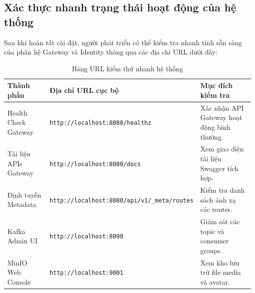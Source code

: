 \documentclass[14pt,a4paper,oneside]{extreport}
\begin{document}
\subsection{Xác thực nhanh trạng thái hoạt động của hệ thống}
Sau khi hoàn tất cài đặt, người phát triển có thể kiểm tra nhanh tính sẵn sàng của phân hệ Gateway và Identity thông qua các địa chỉ URL dưới đây:

\begin{table}[H]
\centering
\caption{Bảng URL kiểm thử nhanh hệ thống}
\label{tab:url-check}
\renewcommand{\arraystretch}{1.3}
\small
\begin{tabularx}{\textwidth}{|l|l|X|}
\hline
\textbf{Thành phần} & \textbf{Địa chỉ URL cục bộ} & \textbf{Mục đích kiểm tra} \\
\hline
Health Check Gateway & \texttt{http://localhost:8080/healthz} & Xác nhận API Gateway hoạt động bình thường. \\
\hline
Tài liệu APIs Gateway & \texttt{http://localhost:8080/docs} & Xem giao diện tài liệu Swagger tích hợp. \\
\hline
Định tuyến Metadata & \texttt{http://localhost:8080/api/v1/\_meta/routes} & Kiểm tra danh sách ánh xạ các routes. \\
\hline
Kafka Admin UI & \texttt{http://localhost:8090} & Giám sát các topic và consumer groups. \\
\hline
MinIO Web Console & \texttt{http://localhost:9001} & Xem kho lưu trữ file media và avatar. \\
\hline
\end{tabularx}
\end{table}
\end{document}
